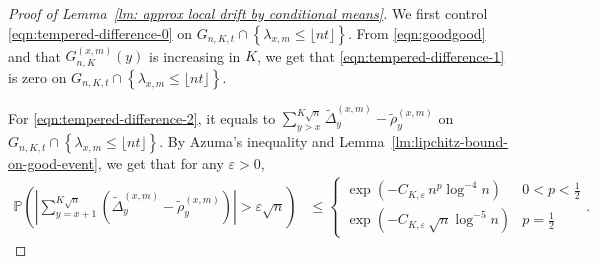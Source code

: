 \documentclass[twoside,12pt, a4paper, final]{article}
\numberwithin{equation}{section}
\theoremstyle{remark}
\begin{document}
	\begin{proof}[Proof of Lemma~\ref{lm: approx local drift by conditional means}]
		We first control \eqref{eqn:tempered-difference-0} on $G_{n, K, t} \cap \left\{\lambda_{x,m} \leq\lfloor nt \rfloor \right\}$. From \eqref{eqn:goodgood} and that $G_{n,K}^{(x,m)}(y)$ is increasing in $K$, we get that  \eqref{eqn:tempered-difference-1} is zero on $G_{n, K, t} \cap \left\{\lambda_{x,m} \leq\lfloor nt \rfloor \right\}$. 
		
		For \eqref{eqn:tempered-difference-2}, it equals to
		$
		\sum_{y > x}^{K\sqrt{n}} \tilde \Delta_{y}^{(x,m)} - \tilde\rho_y^{(x,m)}
		$
		on $G_{n, K, t} \cap \left\{\lambda_{x,m} \leq\lfloor nt \rfloor \right\}$. By Azuma's inequality and Lemma~\ref{lm:lipchitz-bound-on-good-event}, we get that for any $\varepsilon>0$,
		\begin{align}
			\mathbb{P}\left( \left| \sum_{y = x + 1}^{K \sqrt{n} } (\tilde\Delta_y^{(x,m)} - \tilde\rho_y^{(x,m)}) \right| > \varepsilon \sqrt{n}  \right) 
			&
			\label{eqn:azuma-drift-martingale}
			\le \begin{cases}
				\exp\left( - C_{K, \varepsilon} \, n^{p } \log^{-4} n \right)
				& 0 < p < \frac{1}{2} \\
				\exp\left( - C_{K, \varepsilon} \, \sqrt{n}  \log^{-5} n \right)
				& p = \frac{1}{2}
			\end{cases}
			.\end{align}
		

\end{proof}
\end{document}
